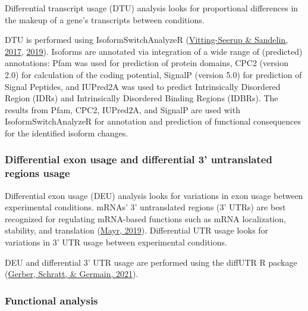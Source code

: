 \documentclass[12pt,twoside]{reedthesis}
\begin{document}
Differential transcript usage (DTU) analysis looks for proportional
differences in the makeup of a gene's transcripts between conditions.

DTU is performed using IsoformSwitchAnalyzeR (\protect\hyperlink{ref-vitting-seerup2017}{Vitting-Seerup \& Sandelin, 2017}, \protect\hyperlink{ref-vitting-seerup2019}{2019}). Isoforms are annotated via integration of a wide
range of (predicted) annotations: Pfam was used for prediction of
protein domains, CPC2 (version 2.0) for calculation of the coding
potential, SignalP (version 5.0) for prediction of Signal Peptides, and
IUPred2A was used to predict Intrinsically Disordered Region (IDRs) and
Intrinsically Disordered Binding Regions (IDBRs). The results from Pfam,
CPC2, IUPred2A, and SignalP are used with IsoformSwitchAnalyzeR for
annotation and prediction of functional consequences for the identified
isoform changes.

\hypertarget{m3.2.6}{%
\subsubsection*{Differential exon usage and differential 3' untranslated regions usage}\label{m3.2.6}}

Differential exon usage (DEU) analysis looks for variations in exon
usage between experimental conditions. mRNAs' 3' untranslated regions
(3' UTRs) are best recognized for regulating mRNA-based functions such
as mRNA localization, stability, and translation (\protect\hyperlink{ref-mayr2019}{Mayr, 2019}).
Differential UTR usage looks for variations in 3' UTR usage between
experimental conditions.

DEU and differential 3' UTR usage are performed using the diffUTR R
package (\protect\hyperlink{ref-gerber2021}{Gerber, Schratt, \& Germain, 2021}).

\hypertarget{m3.2.7}{%
\subsubsection*{Functional analysis}\label{m3.2.7}}
\end{document}
